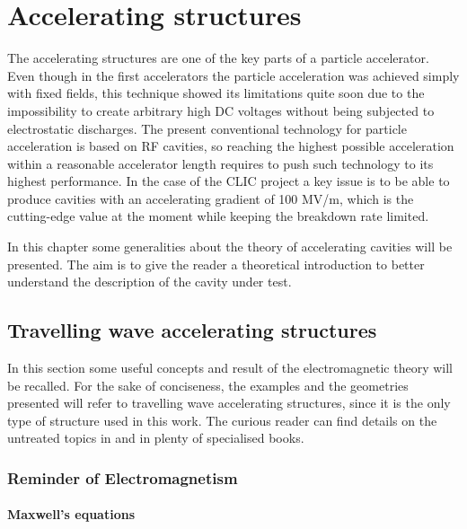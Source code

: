 \chapter[Accelerating structures]{Accelerating structures}

The accelerating structures are one of the key parts of a particle accelerator. Even though in the first accelerators the particle acceleration was achieved simply with fixed fields, this technique showed its limitations quite soon due to the impossibility to create arbitrary high DC voltages without being subjected to electrostatic discharges. The present conventional technology for particle acceleration is based on RF cavities, so reaching the highest possible acceleration within a reasonable accelerator length requires to push such technology to its highest performance. In the case of the CLIC project a key issue is to be able to produce cavities with an accelerating gradient of 100 MV/m, which is the cutting-edge value at the moment while keeping the breakdown rate limited.

In this chapter some generalities about the theory of accelerating cavities will be presented. The aim is to give the reader a theoretical introduction to better understand the description of the cavity under test.

\section[Travelling wave accelerating structures]{Travelling wave accelerating structures}

In this section some useful concepts and result of the electromagnetic theory will be recalled. For the sake of conciseness, the examples and the geometries presented will refer to travelling wave accelerating structures, since it is the only type of structure used in this work. The curious reader can find details on the untreated topics in \cite{Weiss:261732,Wangler:RF_LINAC,Humphries:107756} and in plenty of specialised books.

\subsection[Reminder of Electromagnetism]{Reminder of Electromagnetism}

\subsubsection{Maxwell's equations}

